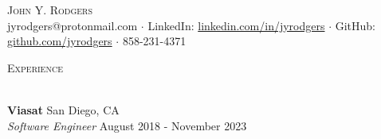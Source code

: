 \documentclass[a4paper]{article}
\newcommand{\lineunder} {
    \vspace*{-8pt} \\
    \hspace*{-18pt} \hrulefill \\
}
\newcommand{\header} [1] {
    {\hspace*{-18pt}\vspace*{6pt} \textsc{#1}}
    \vspace*{-6pt} \lineunder
}
\begin{document}
\vspace*{-40pt}



\vspace*{-10pt}
\begin{center}
	{\Huge \scshape {John Y. Rodgers}}\\
	jyrodgers@protonmail.com $\cdot$ LinkedIn: \href{https://www.linkedin.com/in/jyrodgers/}{linkedin.com/in/jyrodgers} $\cdot$ GitHub: \href{https://github.com/jyrodgers}{github.com/jyrodgers} $\cdot$  858-231-4371 \\
\end{center}

\header{Experience}
\vspace{1mm}

\textbf{Viasat} \hfill San Diego, CA\\
\textit{Software Engineer} \hfill August 2018 - November 2023\\
\vspace{1mm}
\end{document}
